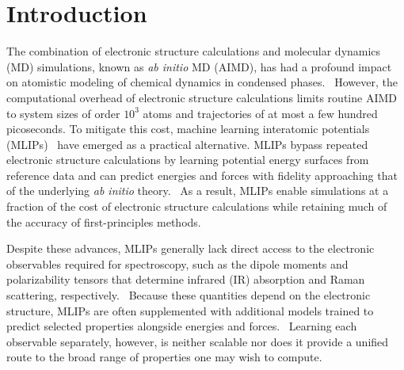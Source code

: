 \documentclass[12pt]{article}
\begin{document}
\section{Introduction}\label{sec:intro}
The combination of electronic structure calculations and molecular dynamics (MD) simulations, known as {\it ab initio} MD (AIMD), has had a profound impact on atomistic modeling of chemical dynamics in condensed phases.~\cite{car1985unified,tuckerman2002abinitio,marx2009abinitio}
However, the computational overhead of electronic structure calculations limits routine AIMD to system sizes of order $10^3$ atoms and trajectories of at most a few hundred picoseconds.
To mitigate this cost, machine learning interatomic potentials (MLIPs)~\cite{behler2011atom,schutt2017schnet,unke2021chemrev} have emerged as a practical alternative. MLIPs bypass repeated electronic structure calculations by learning potential energy surfaces from reference data and can predict energies and forces with fidelity approaching that of the underlying {\it ab initio} theory.~\cite{behler2007generalized, chmiela2017machine, batzner2021nequip, batatia2022mace}  
As a result, MLIPs enable simulations at a fraction of the cost of electronic structure calculations while retaining much of the accuracy of first-principles methods.

Despite these advances, MLIPs generally lack direct access to the electronic observables required for spectroscopy, such as the dipole moments and polarizability tensors that determine infrared (IR) absorption and Raman scattering, respectively.~\cite{jindal2025computing,kapil2023firstprinciples} 
Because these quantities depend on the electronic structure, MLIPs are often supplemented with additional models trained to predict selected properties alongside energies and forces.~\cite{ji2025universal} 
Learning each observable separately, however, is neither scalable nor does it provide a unified route to the broad range of properties one may wish to compute.
\end{document}
